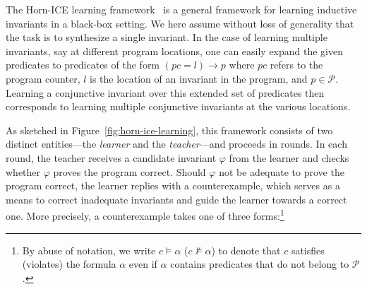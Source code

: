 The Horn-ICE learning framework~\cite{DBLP:conf/tacas/ChampionC0S18,DBLP:journals/pacmpl/EzudheenND0M18} is a general framework for learning inductive invariants in a black-box setting.
We here assume without loss of generality that the task is to synthesize a single invariant.
In the case of learning multiple invariants, say at different program locations, one can easily expand the given predicates to predicates of the form $(\mathit{pc} = l) \rightarrow p$ where $\mathit{pc}$ refers to the program counter, $l$ is the location of an invariant in the program, and $p \in \mathcal P$.
Learning a conjunctive invariant over this extended set of predicates then corresponds to learning multiple conjunctive invariants at the various locations. %

As sketched in Figure~\ref{fig:horn-ice-learning}, this framework consists of two distinct entities---the \emph{learner} and the \emph{teacher}---and proceeds in rounds.
%
In each round, the teacher receives a candidate invariant $\varphi$ from the learner and checks whether $\varphi$ proves the program correct.
Should $\varphi$ not be adequate to prove the program correct, the learner replies with a counterexample, which serves as a means to correct inadequate invariants and guide the learner towards a correct one.
More precisely, a counterexample takes one of three forms:\footnote{By abuse of notation, we write $c \models \alpha$ ($c \not\models \alpha$) to denote that $c$ satisfies (violates) the formula $\alpha$ even if $\alpha$ contains predicates that do not belong to $\mathcal P$.}
